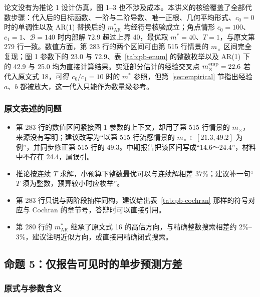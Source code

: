 论文没有为推论 1 设计仿真，图 1–3 也不涉及成本。本讲义的核验覆盖了全部代数步骤：代入后的目标函数、一阶与二阶导数、唯一正根、几何平均形式、$c_0=0$ 时的单调性以及 AR(1) 替换后的 $m^*_{\mathrm{AR}}$ 均经符号核验成立；角点情形 $c_0=100$、$c_1=1$、$\mathcal B=140$ 时内部解 72.9 超过上界 40，最优取 $m^*=40$、$T=1$，与原文第 279 行一致。数值方面，第 283 行的两个区间可由第 515 行情景的 $m_\times$ 区间完全复现；图 1 参数下的 23.0 与 72.9、表~\ref{tab:pb-enum} 的整数枚举以及 AR(1) 下的 42.9 与 25.0 均为直接计算结果。实证部分估计的经验交叉点 $m_\times^{\rm emp}=22.6$ 若代入原文式 18，可得 $c_0/c_1=10$ 时的 $m^*$ 参照，但第~\ref{sec:empirical} 节指出经验 $a$、$b$ 都被放大，这一代入只能作为数量级参考。

\subsubsection{原文表述的问题}

\begin{itemize}
\item 第 283 行的数值区间紧接图 1 参数的上下文，却用了第 515 行情景的 $m_\times$，来源没有写明；建议改写为“以第 515 行流感情景的 $m_\times\in[21.3,49.2]$ 为例”，并同步修正第 515 行的 49.3。中期报告把该区间写成“14.6～24.4”，材料中不存在 24.4，属误引。
\item 推论按连续 $T$ 求解，小预算下整数最优可以与连续解相差 37\%；建议补一句“$T$ 须为整数，预算较小时应枚举”。
\item 第 283 行只说与两阶段抽样同构，建议给出表~\ref{tab:pb-cochran} 那样的符号对应与 Cochran 的章节号，答辩时可以直接引用。
\item 第 280 行的 $m^*_{\mathrm{AR}}$ 继承了原文式 16 的高估方向，与精确整数搜索相差约 2\%–3\%，建议注明近似方向，或直接用精确闭式搜索。
\end{itemize}

\subsection{命题 5：仅报告可见时的单步预测方差}

\subsubsection{原式与参数含义}

